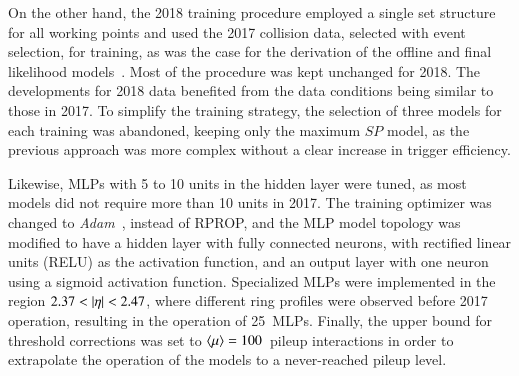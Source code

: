 

On the other hand, the 2018 training procedure employed a single set structure for all working points and used the 2017 collision data, selected with  \Zee{} \tnp{} event selection, for training, as was the case for the derivation of the offline and final \hlt likelihood models~\cite{PERF-2017-01}. 
Most of the procedure was kept unchanged for 2018. The developments for 2018 data benefited from the data conditions being similar to those in 2017. To simplify the training strategy, the selection of three models for each training was abandoned, keeping only the maximum $SP$ model, as the previous approach was more complex without a clear increase in trigger efficiency. 

Likewise, MLPs with 5 to 10 units in the hidden layer were tuned, as most models did not require more than 10 units in 2017. The training optimizer was changed to \emph{Adam}~\cite{kingma2014adam}, instead of RPROP, and the MLP model topology was modified to have a hidden layer with fully connected neurons, with rectified linear units (RELU) as the activation function, and an output layer with one neuron using a sigmoid activation function. Specialized MLPs were implemented in the region $2.37<\abseta<2.47$, where different ring profiles were observed before 2017 operation, resulting in the operation of \SI{25}{MLPs}. Finally, the upper bound for threshold corrections was set to $\langle \mu \rangle{}=100$~pileup interactions in order to extrapolate the operation of the models to a never-reached pileup level. 





